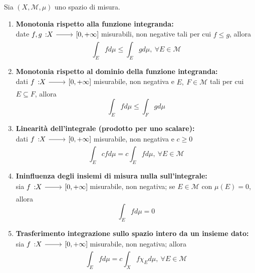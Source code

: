 \begin{property}
	Sia $\left(X,\mathcal{M},\mu\right)$ uno spazio di misura.
	\begin{enumerate}
		\item \textbf{Monotonia rispetto alla funzione integranda:}\\
		date $\funz{f,g}{X}{\left[0,+\infty\right]}$ misurabili, non negative tali per cui $f\leq g$, allora
		\begin{equation}
			\int_E fd\mu\leq \int_E gd\mu,\ \forall E\in\mathcal{M}
		\end{equation}
		\item \textbf{Monotonia rispetto al dominio della funzione integranda:}\\
		dati $\funz{f}{X}{\left[0,+\infty\right]}$ misurabile, non negativa e $E,\ F\in\mathcal{M}$ tali per cui $E\subseteq F$, allora
		\begin{equation}
			\int_Efd\mu\leq \int_Fgd\mu
		\end{equation}
		\item \textbf{Linearità dell'integrale (prodotto per uno scalare):}\\
		dati $\funz{f}{X}{\left[0,+\infty\right]}$ misurabile, non negativa e $c\geq 0$
		\begin{equation}
			\int_E cfd\mu=c\int_Efd\mu,\ \forall E\in\mathcal{M}
		\end{equation}
		\item \textbf{Ininfluenza degli insiemi di misura nulla sull'integrale:}\\
		sia $\funz{f}{X}{\left[0,+\infty\right]}$ misurabile, non negativa; se $E\in\mathcal{M}$ con $\mu\left(E\right)=0$, allora
		\begin{equation}
			\int_Efd\mu=0
		\end{equation}
		\item \textbf{Trasferimento integrazione sullo spazio intero da un insieme dato:}\\
		sia $\funz{f}{X}{\left[0,+\infty\right]}$ misurabile, non negativa; allora
		\begin{equation}
			\int_E fd\mu=c\int_Xf\chi_Ed\mu,\ \forall E\in\mathcal{M}
		\end{equation}
	\end{enumerate}
\end{property}

